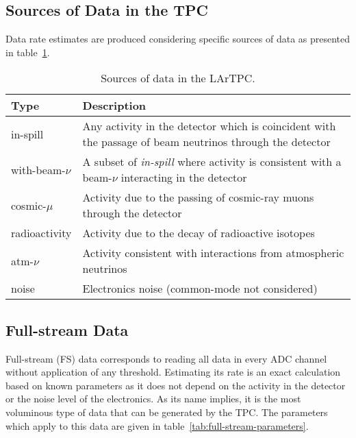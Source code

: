 \subsection{Sources of Data in the TPC}

Data rate estimates are produced considering specific sources of
data as presented in table~\ref{tab:dune-data-sources}.


\begin{table}[ht!]
	\centering
	\begin{tabular}{| p{1in} | p{4.5in} |}
		\hline
	\textbf{Type} & \textbf{Description} \\ \hline
		
	in-spill & Any activity in the detector which is coincident with
	the passage of beam neutrinos through the detector \\ \hline
	
	with-beam-$\nu$ & A subset of \textit{in-spill} where activity is
	consistent with a beam-$\nu$ interacting in the detector \\ \hline
	
	cosmic-$\mu$ & Activity due to the passing of cosmic-ray muons
	through the detector \\ \hline
	
	radioactivity & Activity due to the decay of radioactive
	isotopes \\ \hline
	
	atm-$\nu$ & Activity consistent with interactions from
	atmospheric neutrinos \\ \hline
	
	noise & Electronics noise (common-mode not considered) \\ \hline

	\end{tabular}
	\caption{Sources of data in the LArTPC.}
	\label{tab:dune-data-sources}
\end{table}



%

\subsection{Full-stream Data}

Full-stream (FS) data corresponds to reading all data in every ADC channel without
application of any threshold. Estimating its rate is an exact calculation based on
known parameters as it does not depend on the activity in the detector or the noise
level of the electronics. As its name implies, it is the most voluminous type of data
that can be generated by the TPC. The parameters which apply to this data are given in
table~\ref{tab:full-stream-parameters}.

